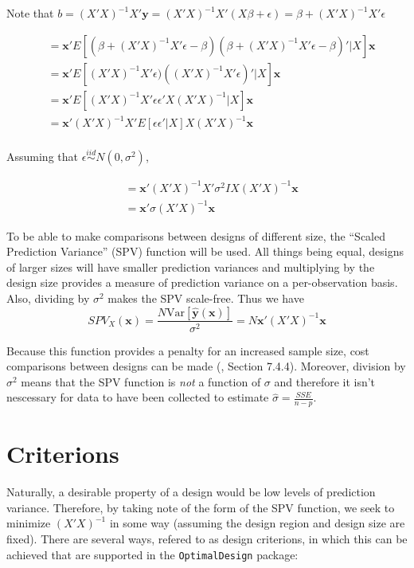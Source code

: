 \documentclass{article}\usepackage[]{graphicx}\usepackage[]{color}
\newcommand{\Var}{\mathrm{Var}}
\begin{document}
Note that $b=(X'X)^{-1} X'\textbf{y} = (X'X)^{-1}X'(X\beta+\epsilon) = \beta + (X'X)^{-1} X'\epsilon$

\begin{align*}
  &= \textbf{x}' E[(\beta + (X'X)^{-1}X'\epsilon - \beta)(\beta + (X'X)^{-1}X'\epsilon - \beta)' | X] \textbf{x} \\
  &= \textbf{x}' E[(X'X)^{-1}X'\epsilon)((X'X)^{-1}X'\epsilon)' | X] \textbf{x} \\
  &= \textbf{x}' E[(X'X)^{-1}X'\epsilon \epsilon' X (X'X)^{-1} | X] \textbf{x} \\
  &= \textbf{x}' (X'X)^{-1} X' E[\epsilon \epsilon' | X] X(X'X)^{-1} \textbf{x} \\
\end{align*}

Assuming that $\epsilon \stackrel{iid}{\sim} N(0,\sigma^2) $,

\begin{align*}
  &= \textbf{x}' (X'X)^{-1} X' \sigma^2 I X(X'X)^{-1} \textbf{x} \\
  &= \textbf{x}' \sigma (X' X)^{-1} \textbf{x}
\end{align*}

To be able to make comparisons between designs of different size, the ``Scaled Prediction Variance'' (SPV) function will be used. All things being equal, designs of larger sizes will have smaller prediction variances and multiplying by the design size provides a measure of prediction variance on a per-observation basis. Also, dividing by $\sigma^2$ makes the SPV scale-free. Thus we have
$$ SPV_X(\textbf{x}) = \frac{N \Var[\hat{\textbf{y}}(\textbf{x})]}{\sigma^2} = N \textbf{x}' (X' X)^{-1} \textbf{x} $$

Because this function provides a penalty for an increased sample size, cost comparisons between designs can be made (\cite{myers}, Section 7.4.4). Moreover, division by $\sigma^2$ means that the SPV function is \textit{not} a function of $\sigma$ and therefore it isn't nescessary for data to have been collected to estimate $\hat{\sigma} = \frac{SSE}{n-p}$.

\section{Criterions}
Naturally, a desirable property of a design would be low levels of prediction variance. Therefore, by taking note of the form of the SPV function, we seek to minimize $(X'X)^{-1}$ in some way (assuming the design region and design size are fixed). There are several ways, refered to as design criterions, in which this can be achieved that are supported in the \texttt{OptimalDesign} package:
\end{document}
